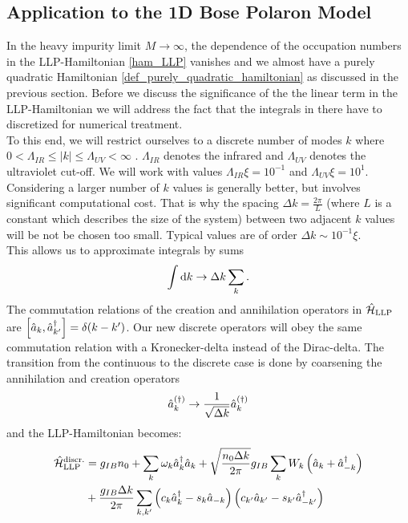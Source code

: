 \subsection{Application to the 1D Bose Polaron Model}
In the heavy impurity limit $M\rightarrow \infty$, the dependence of the occupation numbers in the LLP-Hamiltonian \ref{ham_LLP} vanishes and we almost have a purely quadratic Hamiltonian \ref{def_purely_quadratic_hamiltonian} as discussed in the previous section. Before we discuss the significance of the the linear term in the LLP-Hamiltonian we will address the fact that the integrals in there have to discretized for numerical treatment.\\
To this end, we will restrict ourselves to a discrete number of modes $k$ where $0<\Lambda_{IR}\leq |k|\leq\Lambda_{UV}<\infty$ . $\Lambda_{IR}$ denotes the infrared and $\Lambda_{UV}$ denotes the ultraviolet cut-off. We will work with values $\Lambda_{IR}\xi= 10^{-1}$ and $\Lambda_{UV}\xi= 10^1$. \\
Considering a larger number of $k$ values is generally better, but involves significant computational cost. That is why the spacing $\Delta k=\frac{2\pi}{L}$ (where $L$ is a constant which describes the size of the system) between two adjacent $k$ values will be not be chosen too small. Typical values are of order $\Delta k\sim 10^{-1}\xi$.  \\
This allows us to approximate integrals by sums
\begin{equation}
\int\mathrm d k\rightarrow \Delta k\sum\limits_k.
\end{equation}
The commutation relations of the creation and annihilation operators in $\hat{\mathcal{H}}_{\mathrm{LLP}}$ are $\left[\hat a_k,\hat a^\dagger_{k^\prime}\right]=\delta(k-k^\prime)$. Our new discrete operators will obey the same commutation relation with a Kronecker-delta instead of the Dirac-delta.
The transition from the continuous to the discrete case is done by coarsening the annihilation and creation operators
\begin{equation}
\hat a_k^{\left(\dagger\right)}\rightarrow \frac1{\sqrt{\Delta k}}\hat a_k^{\left(\dagger\right)}
\end{equation}
and the LLP-Hamiltonian becomes:
\begin{align}\label{ham_LLP_discrete}
\hat{\mathcal{H}}_{\mathrm{LLP}}^{\mathrm{discr.}} &=g_{IB}n_0+\sum\limits_k \omega_{ k}\hat a^\dagger_{ k}\hat a_{ k}+\sqrt{\frac{n_0\Delta k}{2\pi}}g_{IB}\sum\limits_k W_k \left(\hat a_{ k}+\hat a^\dagger_{- k}\right) \\ &+ \frac{g_{IB}\Delta k}{2\pi}\sum\limits_{k,k^\prime} \left(c_k\hat a^\dagger_k-s_k\hat a_{-k}\right)\left(c_{k^\prime}\hat a_{k^\prime}-s_{k^\prime}\hat a^\dagger_{-k^\prime}\right)\nonumber
\end{align}
